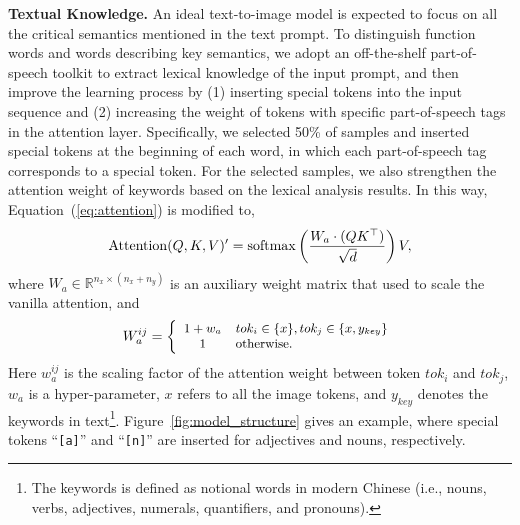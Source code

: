 \documentclass[10pt,twocolumn,letterpaper]{article}
\begin{document}
\noindent\textbf{Textual Knowledge.}
An ideal text-to-image model is expected to focus on all the critical semantics mentioned in the text prompt.
To distinguish function words and words describing key semantics, we adopt an off-the-shelf part-of-speech toolkit to extract lexical knowledge of the input prompt, and then improve the learning process by (1) inserting special tokens into the input sequence and (2) increasing the weight of tokens with specific part-of-speech tags in the attention layer.
Specifically, we selected 50\% of samples and inserted special tokens at the beginning of each word, in which each part-of-speech tag corresponds to a special token.
For the selected samples, we also strengthen the attention weight of keywords based on the lexical analysis results. 
In this way, Equation~(\ref{eq:attention}) is modified to,
\begin{equation}
\small
    {\rm Attention}(Q, K, V)' = {\rm softmax} \left( \frac{W_a \cdot (QK^{\top})}{\sqrt{d}} \right) V,
\end{equation}
where $W_a \in \mathbb{R}^{n_x \times (n_x+n_y)}$ is an auxiliary weight matrix that used to scale the vanilla attention, and
\begin{equation}
\small
    W_a^{ij} = \left\{ \begin{array}{cl} 1+w_a & { tok_i \in \{x\}, tok_j \in \{x, y_{key}\}} \\ 1 & {\rm otherwise.}   
    \end{array}\right.
\end{equation}
Here $w_a^{ij}$ is the scaling factor of the attention weight between token ${tok_i}$ and ${tok_j}$, $w_a$ is a hyper-parameter, $x$ refers to all the image tokens, and $y_{key}$ denotes the keywords in text\footnote{The keywords is defined as notional words in modern Chinese (i.e., nouns, verbs, adjectives, numerals, quantifiers, and pronouns).}. Figure~\ref{fig:model_structure} gives an example, where special tokens ``\verb|[a]|'' and ``\verb|[n]|'' are inserted for adjectives and nouns, respectively.
\end{document}
